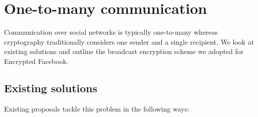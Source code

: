 





\FloatBarrier
\section{One-to-many communication}

Communication over social networks is typically one-to-many whereas cryptography traditionally considers one sender and a single recipient. We look at existing solutions and outline the broadcast encryption scheme we adopted for Encrypted Facebook.


\FloatBarrier
\subsection{Existing solutions}
\label{ssec:exist}

Existing proposals tackle this problem in the following ways:

